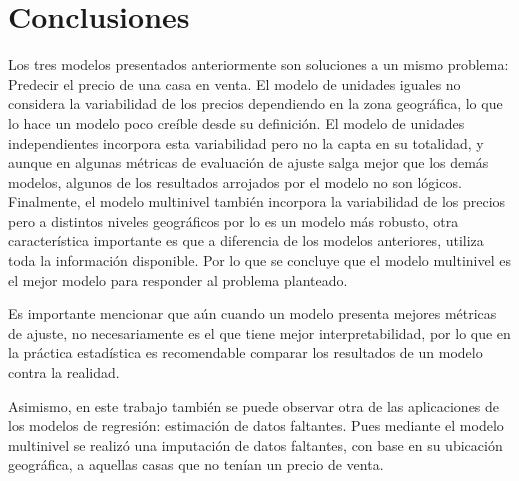 
\section{Conclusiones}
\label{sec:conclusiones}

Los tres modelos presentados anteriormente son soluciones a un mismo problema: Predecir el precio de una casa en venta. El modelo de unidades iguales no considera la variabilidad de los precios dependiendo en la zona geográfica, lo que lo hace un modelo poco creíble desde su definición. El modelo de unidades independientes incorpora esta variabilidad pero no la capta en su totalidad, y aunque en algunas métricas de evaluación de ajuste salga mejor que los demás modelos, algunos de los resultados arrojados por el modelo no son lógicos. Finalmente, el modelo multinivel también incorpora la variabilidad de los precios pero a distintos niveles geográficos por lo es un modelo más robusto, otra característica importante es que a diferencia de los modelos anteriores, utiliza toda la información disponible. Por lo que se concluye que el modelo multinivel es el mejor modelo para responder al problema planteado.

Es importante mencionar que aún cuando un modelo presenta mejores métricas de ajuste, no necesariamente es el que tiene mejor interpretabilidad, por lo que en la práctica estadística es recomendable comparar los resultados de un modelo contra la realidad.

Asimismo, en este trabajo también se puede observar otra de las aplicaciones de los modelos de regresión: estimación de datos faltantes. Pues mediante el modelo multinivel se realizó una imputación de datos faltantes, con base en su ubicación geográfica, a aquellas casas que no tenían un precio de venta.
